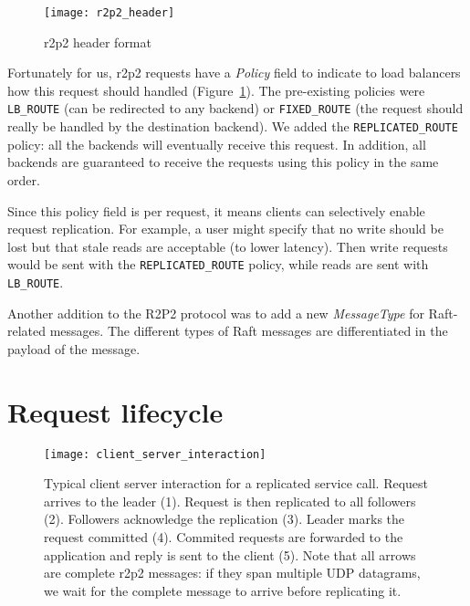 \begin{figure}[h]
    \centering
    \texttt{[image: r2p2\_header]}
    \caption{\gls{r2p2} header format\cite{r2p2}}
    \label{fig:r2p2-header}
\end{figure}


Fortunately for us, \gls{r2p2} requests have a \emph{Policy} field to indicate to load balancers how this request should handled (Figure~\ref{fig:r2p2-header}).
The pre-existing policies were \texttt{LB\_ROUTE} (can be redirected to any backend) or \texttt{FIXED\_ROUTE} (the request should really be handled by the destination backend).
We added the \texttt{REPLICATED\_ROUTE} policy: all the backends will eventually receive this request.
In addition, all backends are guaranteed to receive the requests using this policy in the same order.

Since this policy field is per request, it means clients can selectively enable request replication.
For example, a user might specify that no write should be lost but that stale reads are acceptable (to lower latency).
Then write requests would be sent with the \texttt{REPLICATED\_ROUTE} policy, while reads are sent with \texttt{LB\_ROUTE}.

Another addition to the R2P2 protocol was to add a new \emph{MessageType} for Raft-related messages.
The different types of Raft messages are differentiated in the payload of the message.

\section{Request lifecycle}

\begin{figure}[hp]
    \centering
    \texttt{[image: client\_server\_interaction]}
    \caption{Typical client server interaction for a replicated service call.
        Request arrives to the leader (1).
        Request is then replicated to all followers (2).
        Followers acknowledge the replication (3).
        Leader marks the request committed (4).
        Commited requests are forwarded to the application and reply is sent to the client (5).
        Note that all arrows are complete \gls{r2p2} messages: if they span multiple UDP datagrams, we wait for the complete message to arrive before replicating it.
    \label{fig:client-server-interaction}
    }
\end{figure}


